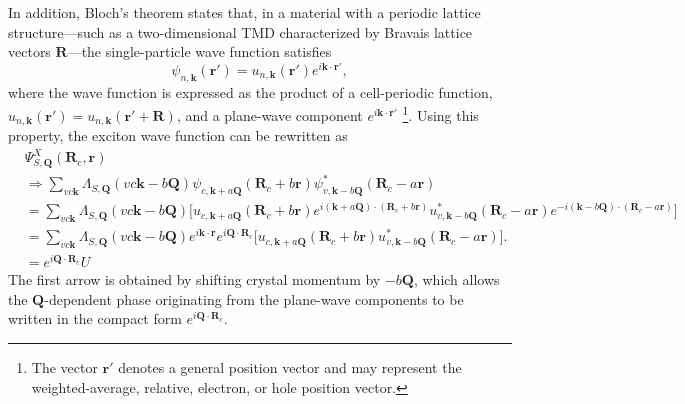 In addition, Bloch's theorem states that, in a material with a periodic lattice structure---such as a two-dimensional TMD characterized by Bravais lattice vectors $\boldsymbol{R}$---the single-particle wave function satisfies~\cite{griffiths2018introduction, haber2023maximally}
\begin{equation}
\psi_{n,\boldsymbol{k}}(\boldsymbol{r}')
=
u_{n,\boldsymbol{k}}(\boldsymbol{r}')
e^{i\boldsymbol{k}\cdot\boldsymbol{r}'},
\end{equation}
where the wave function is expressed as the product of a cell-periodic function, $u_{n,\boldsymbol{k}}(\boldsymbol{r}')=u_{n,\boldsymbol{k}}(\boldsymbol{r}'+\boldsymbol{R})$, and a plane-wave component $e^{i\boldsymbol{k}\cdot\boldsymbol{r}'}$ \footnote{The vector $\boldsymbol{r}'$ denotes a general position vector and may represent the weighted-average, relative, electron, or hole position vector.}. Using this property, the exciton wave function can be rewritten as
\begin{equation}
\begin{aligned}
&\Psi^{X}_{S,\boldsymbol{Q}}
(\boldsymbol{R}_c,\boldsymbol{r}) \\
&\Rightarrow
\sum_{vc\boldsymbol{k}}
\Lambda_{S,\boldsymbol{Q}}(vc\boldsymbol{k}-b\boldsymbol{Q})
\psi_{c,\boldsymbol{k}+a\boldsymbol{Q}}(\boldsymbol{R}_c + b\boldsymbol{r})
\psi^{*}_{v,\boldsymbol{k}-b\boldsymbol{Q}}(\boldsymbol{R}_c - a\boldsymbol{r}) \\
&=
\sum_{vc\boldsymbol{k}}
\Lambda_{S,\boldsymbol{Q}}(vc\boldsymbol{k}-b\boldsymbol{Q})
\Big[
u_{c,\boldsymbol{k}+a\boldsymbol{Q}}(\boldsymbol{R}_c+b\boldsymbol{r})
e^{i(\boldsymbol{k}+a\boldsymbol{Q})\cdot(\boldsymbol{R}_c+b\boldsymbol{r})}
u^{*}_{v,\boldsymbol{k}-b\boldsymbol{Q}}(\boldsymbol{R}_c-a\boldsymbol{r})
e^{-i(\boldsymbol{k}-b\boldsymbol{Q})\cdot(\boldsymbol{R}_c-a\boldsymbol{r})}
\Big] \\
&=
\sum_{vc\boldsymbol{k}}
\Lambda_{S,\boldsymbol{Q}}(vc\boldsymbol{k}-b\boldsymbol{Q})
e^{i\boldsymbol{k}\cdot\boldsymbol{r}}
e^{i\boldsymbol{Q}\cdot\boldsymbol{R}_c}
\Big[
u_{c,\boldsymbol{k}+a\boldsymbol{Q}}
(\boldsymbol{R}_c+b\boldsymbol{r})
u^{*}_{v,\boldsymbol{k}-b\boldsymbol{Q}}
(\boldsymbol{R}_c-a\boldsymbol{r})
\Big].\\
&=
e^{i\boldsymbol{Q}\cdot\boldsymbol{R}_c}
U
\end{aligned}
\label{excitonWF3}
\end{equation}
The first arrow is obtained by shifting crystal momentum by $-b\boldsymbol{Q}$, which allows the $\boldsymbol{Q}$-dependent phase originating from the plane-wave components to be written in the compact form $e^{i\boldsymbol{Q}\cdot\boldsymbol{R}_c}$.


